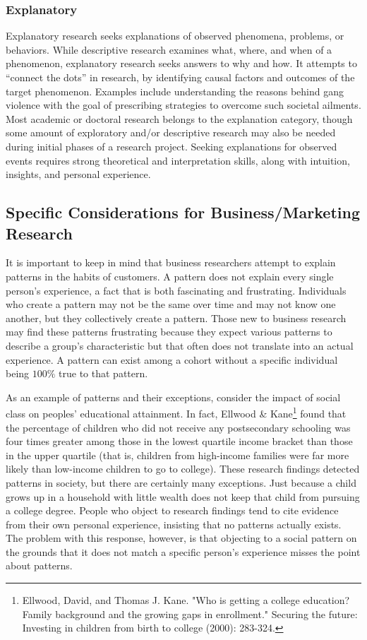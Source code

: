 \subsubsection{Explanatory}

Explanatory research seeks explanations of observed phenomena, problems, or behaviors. While descriptive research examines what, where, and when of a phenomenon, explanatory research seeks answers to why and how. It attempts to ``connect the dots'' in research, by identifying causal factors and outcomes of the target phenomenon. Examples include understanding the reasons behind gang violence with the goal of prescribing strategies to overcome such societal ailments. Most academic or doctoral research belongs to the explanation category, though some amount of exploratory and/or descriptive research may also be needed during initial phases of a research project. Seeking explanations for observed events requires strong theoretical and interpretation skills, along with intuition, insights, and personal experience.

\subsection{Specific Considerations for Business/Marketing Research}

It is important to keep in mind that business researchers attempt to explain patterns in the habits of customers. A pattern does not explain every single person's experience, a fact that is both fascinating and frustrating. Individuals who create a pattern may not be the same over time and may not know one another, but they collectively create a pattern. Those new to business research may find these patterns frustrating because they expect various patterns to describe a group's characteristic but that often does not translate into an actual experience. A pattern can exist among a cohort without a specific individual being $ 100\% $ true to that pattern.

As an example of patterns and their exceptions, consider the impact of social class on peoples' educational attainment. In fact, Ellwood \& Kane\footnote{Ellwood, David, and Thomas J. Kane. "Who is getting a college education? Family background and the growing gaps in enrollment." Securing the future: Investing in children from birth to college (2000): 283-324.} found that the percentage of children who did not receive any postsecondary schooling was four times greater among those in the lowest quartile income bracket than those in the upper quartile (that is, children from high-income families were far more likely than low-income children to go to college). These research findings detected patterns in society, but there are certainly many exceptions. Just because a child grows up in a household with little wealth does not keep that child from pursuing a college degree. People who object to research findings tend to cite evidence from their own personal experience, insisting that no patterns actually exists. The problem with this response, however, is that objecting to a social pattern on the grounds that it does not match a specific person's experience misses the point about patterns.

